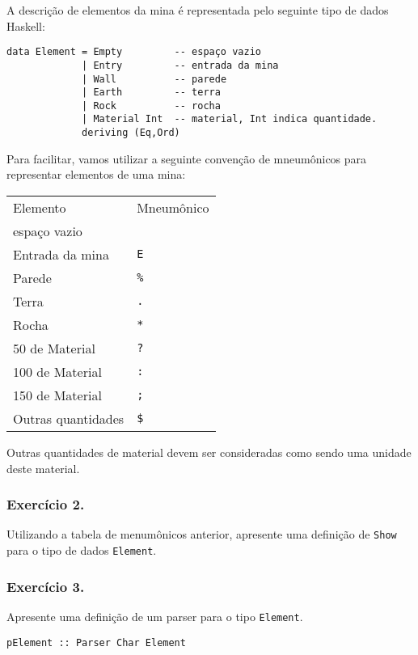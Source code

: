 \documentclass[a4paper]{article}
\begin{document}
A descrição de elementos da mina é representada pelo seguinte tipo de dados Haskell:

\begin{verbatim}
data Element = Empty         -- espaço vazio
             | Entry         -- entrada da mina
             | Wall          -- parede
             | Earth         -- terra
             | Rock          -- rocha
             | Material Int  -- material, Int indica quantidade.
             deriving (Eq,Ord)
\end{verbatim}

Para facilitar, vamos utilizar a seguinte convenção de mneumônicos para representar
elementos de uma mina:

\begin{center}
\begin{tabular}{ll}
Elemento & Mneumônico\\
espaço vazio & \\
Entrada da mina & \texttt{E}\\
Parede & \texttt{\%}\\
Terra & \texttt{.}\\
Rocha & \texttt{*}\\
50 de Material & \texttt{?}\\
100 de Material & \texttt{:}\\
150 de Material & \texttt{;}\\
Outras quantidades & \texttt{\$}\\
\end{tabular}
\end{center}

Outras quantidades de material devem ser consideradas como sendo uma unidade deste
material.

\subsubsection{Exercício 2.}
\label{sec:org9719489}

Utilizando a tabela de menumônicos anterior, apresente uma definição de \texttt{Show} para
o tipo de dados \texttt{Element}.

\subsubsection{Exercício 3.}
\label{sec:orgede2d17}

Apresente uma definição de um parser para o tipo \texttt{Element}.

\begin{verbatim}
pElement :: Parser Char Element
\end{verbatim}
\end{document}
